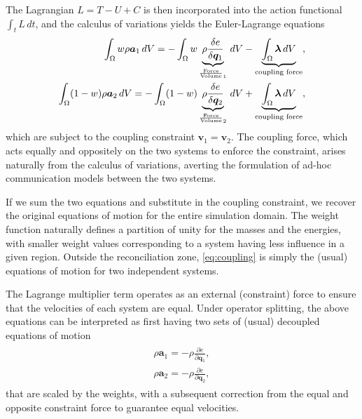 The Lagrangian $L = T - U + C$ is then incorporated into the action functional $\int_t L \,dt$, and the calculus of
variations yields the Euler-Lagrange equations
\begin{align}
\label{eq:coupling}
\begin{aligned}
\int_\Omega w \rho \bm{a}_1 \,dV = - \int_\Omega w \underbrace{\rho \frac{\delta e}{\delta \bm{q}_1}}_{\frac{\text{Force}}{\text{Volume}}_1} \,dV - \underbrace{\int_\Omega \bm{\lambda}\, dV}_{\textrm{\scriptsize  coupling force}} , \\
\int_\Omega (1-w) \rho \bm{a}_2 \,dV = - \int_\Omega (1-w) \underbrace{\rho \frac{\delta e}{\delta \bm{q}_2}}_{\frac{\text{Force}}{\text{Volume}}_2} \,dV + \underbrace{\int_\Omega \bm{\lambda}\, dV}_{\footnotesize\textrm{\scriptsize  coupling force}} ,
\end{aligned}
\end{align}
which are subject to the coupling constraint $\bm{v}_1 = \bm{v}_2$. The coupling force, which acts equally and
oppositely on the two systems to enforce the constraint, arises naturally from the calculus of variations, averting the
formulation of ad-hoc communication models between the two systems.

If we sum the two equations and substitute in the coupling constraint, we recover the original equations of motion for
the entire simulation domain. The weight function naturally defines a partition of unity for the masses and the
energies, with smaller weight values corresponding to a system having less influence in a given region. Outside the
reconciliation zone, \eqref{eq:coupling} is simply the (usual) equations of motion for two independent systems.

The Lagrange multiplier term operates as an external (constraint) force to ensure that the velocities of each system are
equal. Under operator splitting, the above equations can be interpreted as first having two sets of (usual) decoupled
equations of motion
\begin{align}
\begin{aligned}
\rho \bm{a}_1 = - \rho \frac{\partial e}{\partial \bm{q}_1} , \\
\rho \bm{a}_2 = - \rho \frac{\partial e}{\partial \bm{q}_2} ,
\end{aligned}
\end{align}
that are scaled by the weights, with a subsequent correction from the equal and opposite constraint force to
guarantee equal velocities.

